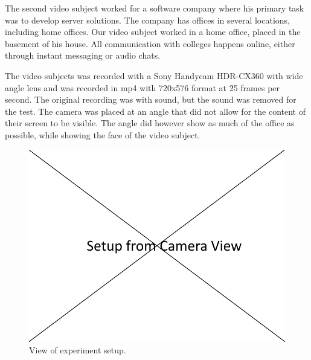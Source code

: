 \documentclass{sigchi}
\begin{document}
The second video subject worked for a software company where his primary task was to develop server solutions.
The company has offices in several locations, including home offices.
Our video subject worked in a home office, placed in the basement of his house.
All communication with colleges happens online, either through instant messaging or audio chats.

The video subjects was recorded with a Sony Handycam HDR-CX360 with wide angle lens and was recorded in mp4 with 720x576 format at 25 frames per second.
The original recording was with sound, but the sound was removed for the test.
The camera was placed at an angle that did not allow for the content of their screen to be visible.
The angle did however show as much of the office as possible, while showing the face of the video subject.

\begin{figure}
  \centering
  \includegraphics[width=\columnwidth]{figures/experiment_setup.png}
  \caption{View of experiment setup.}
  \label{fig:experiment}
\end{figure}
\end{document}
